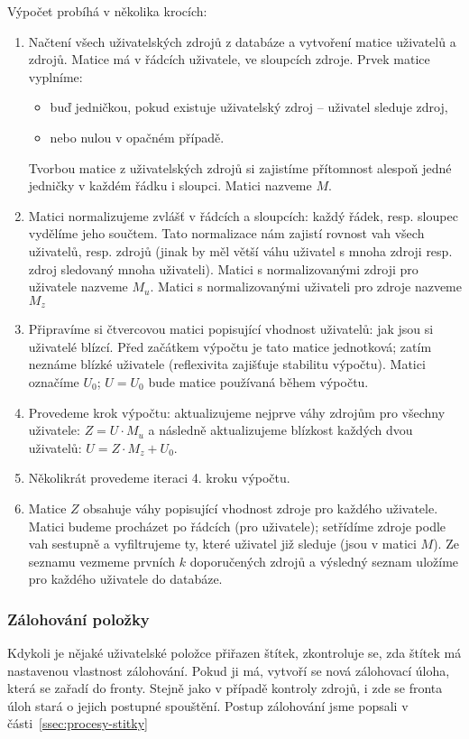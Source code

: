 Výpočet probíhá v několika krocích:
\begin{enumerate}
	\item Načtení všech uživatelských zdrojů z databáze a vytvoření matice uživatelů a zdrojů.
		Matice má v řádcích uživatele, ve sloupcích zdroje.
		Prvek matice vyplníme:
		\begin{itemize}
			\item buď jedničkou, pokud existuje uživatelský zdroj – uživatel sleduje zdroj,
			\item nebo nulou v opačném případě.
		\end{itemize}
		Tvorbou matice z uživatelských zdrojů si zajistíme přítomnost alespoň jedné jedničky v každém řádku i sloupci.
		Matici nazveme $M$.
	\item Matici normalizujeme zvlášť v řádcích a sloupcích: každý řádek, resp. sloupec vydělíme jeho součtem.
		Tato normalizace nám zajistí rovnost vah všech uživatelů, resp. zdrojů (jinak by měl větší váhu uživatel s mnoha zdroji resp. zdroj sledovaný mnoha uživateli).
		Matici s normalizovanými zdroji pro uživatele nazveme $M_u$.
		Matici s normalizovanými uživateli pro zdroje nazveme $M_z$
	\item Připravíme si čtvercovou matici popisující vhodnost uživatelů: jak jsou si uživatelé blízcí.
		Před začátkem výpočtu je tato matice jednotková; zatím neznáme blízké uživatele (reflexivita zajišťuje stabilitu výpočtu).
		Matici označíme $U_0$; $U = U_0$ bude matice používaná během výpočtu.
	\item Provedeme krok výpočtu:
		aktualizujeme nejprve váhy zdrojům pro všechny uživatele:
			$ Z = U \cdot M_u $
		a následně aktualizujeme blízkost každých dvou uživatelů:
			$ U = Z \cdot M_z + U_0 $.
	\item Několikrát provedeme iteraci 4. kroku výpočtu.
	\item Matice $Z$ obsahuje váhy popisující vhodnost zdroje pro každého uživatele.
		Matici budeme procházet po řádcích (pro uživatele); setřídíme zdroje podle vah sestupně a vyfiltrujeme ty, které uživatel již sleduje (jsou v matici $M$).
		Ze seznamu vezmeme prvních $k$ doporučených zdrojů a výsledný seznam uložíme pro každého uživatele do databáze.
\end{enumerate}

\subsubsection{Zálohování položky}

Kdykoli je nějaké uživatelské položce přiřazen štítek, zkontroluje se, zda štítek má nastavenou vlastnost zálohování.
Pokud ji má, vytvoří se nová zálohovací úloha, která se zařadí do fronty.
Stejně jako v případě kontroly zdrojů, i zde se fronta úloh stará o jejich postupné spouštění.
Postup zálohování jsme popsali v části~\ref{ssec:procesy-stitky} 

